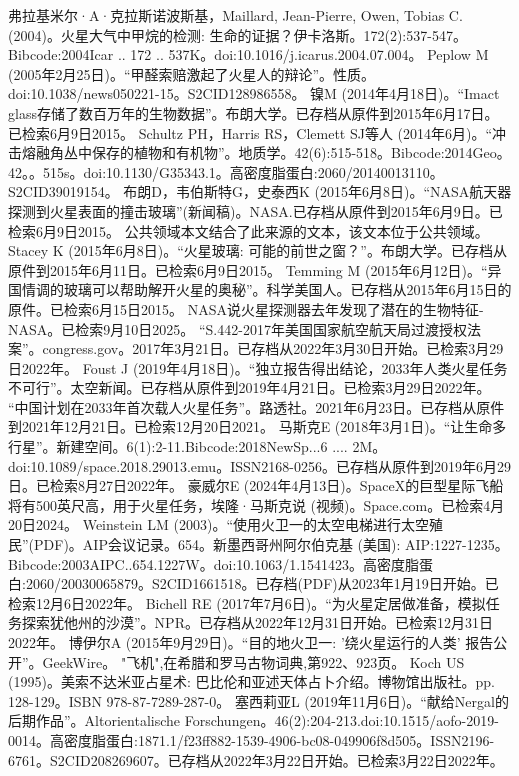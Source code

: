 \begin{enumerate}
 弗拉基米尔·A·克拉斯诺波斯基，Maillard, Jean-Pierre, Owen, Tobias C.(2004)。火星大气中甲烷的检测: 生命的证据？伊卡洛斯。172(2):537-547。Bibcode:2004Icar .. 172 .. 537K。doi:10.1016/j.icarus.2004.07.004。
 Peplow M (2005年2月25日)。“甲醛索赔激起了火星人的辩论”。性质。doi:10.1038/news050221-15。S2CID128986558。 
 镍M (2014年4月18日)。“Imact glass存储了数百万年的生物数据”。布朗大学。已存档从原件到2015年6月17日。已检索6月9日2015。
 Schultz PH，Harris RS，Clemett SJ等人 (2014年6月)。“冲击熔融角丛中保存的植物和有机物”。地质学。42(6):515-518。Bibcode:2014Geo。42。。515s。doi:10.1130/G35343.1。高密度脂蛋白:2060/20140013110。S2CID39019154。 
 布朗D，韦伯斯特G，史泰西K (2015年6月8日)。“NASA航天器探测到火星表面的撞击玻璃”(新闻稿)。NASA.已存档从原件到2015年6月9日。已检索6月9日2015。 公共领域本文结合了此来源的文本，该文本位于公共领域。
 Stacey K (2015年6月8日)。“火星玻璃: 可能的前世之窗？”。布朗大学。已存档从原件到2015年6月11日。已检索6月9日2015。
 Temming M (2015年6月12日)。“异国情调的玻璃可以帮助解开火星的奥秘”。科学美国人。已存档从2015年6月15日的原件。已检索6月15日2015。
 NASA说火星探测器去年发现了潜在的生物特征-NASA。已检索9月10日2025。
 “S.442-2017年美国国家航空航天局过渡授权法案”。congress.gov。2017年3月21日。已存档从2022年3月30日开始。已检索3月29日2022年。
 Foust J (2019年4月18日)。“独立报告得出结论，2033年人类火星任务不可行”。太空新闻。已存档从原件到2019年4月21日。已检索3月29日2022年。
 “中国计划在2033年首次载人火星任务”。路透社。2021年6月23日。已存档从原件到2021年12月21日。已检索12月20日2021。
 马斯克E (2018年3月1日)。“让生命多行星”。新建空间。6(1):2-11.Bibcode:2018NewSp...6 .... 2M。doi:10.1089/space.2018.29013.emu。ISSN2168-0256。已存档从原件到2019年6月29日。已检索8月27日2022年。 
 豪威尔E (2024年4月13日)。SpaceX的巨型星际飞船将有500英尺高，用于火星任务，埃隆·马斯克说 (视频)。Space.com。已检索4月20日2024。
 Weinstein LM (2003)。“使用火卫一的太空电梯进行太空殖民”(PDF)。AIP会议记录。654。新墨西哥州阿尔伯克基 (美国): AIP:1227-1235。Bibcode:2003AIPC..654.1227W。doi:10.1063/1.1541423。高密度脂蛋白:2060/20030065879。S2CID1661518。已存档(PDF)从2023年1月19日开始。已检索12月6日2022年。  
 Bichell RE (2017年7月6日)。“为火星定居做准备，模拟任务探索犹他州的沙漠”。NPR。已存档从2022年12月31日开始。已检索12月31日2022年。
 博伊尔A (2015年9月29日)。“目的地火卫一: '绕火星运行的人类' 报告公开”。GeekWire。
 "飞机",在希腊和罗马古物词典,第922、923页。
 Koch US (1995)。美索不达米亚占星术: 巴比伦和亚述天体占卜介绍。博物馆出版社。pp. 128-129。ISBN 978-87-7289-287-0。
 塞西莉亚L (2019年11月6日)。“献给Nergal的后期作品”。Altorientalische Forschungen。46(2):204-213.doi:10.1515/aofo-2019-0014。高密度脂蛋白:1871.1/f23ff882-1539-4906-bc08-049906f8d505。ISSN2196-6761。S2CID208269607。已存档从2022年3月22日开始。已检索3月22日2022年。  

\end{enumerate}
